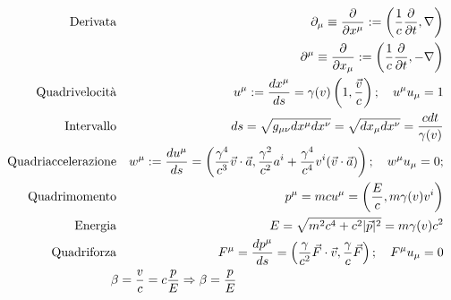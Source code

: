 \begin{align}
    \text{Derivata} & & \partial_\mu \equiv \frac{\partial}{\partial x^\mu} := \left (\frac{1}{c}\frac{\partial}{\partial t}, \nabla \right )\\
    & & \partial^\mu \equiv \frac{\partial}{\partial x_\mu} := \left ( \frac{1}{c}\frac{\partial}{\partial t}, -\nabla \right )\\
    \text{Quadrivelocità} & & u^\mu := \frac{dx^\mu}{ds} = \gamma(v)\left (1, \frac{\vec{v}}{c}\right ); \quad u^\mu u_\mu = 1\\
    \text{Intervallo} & & ds = \sqrt{g_{\mu\nu}dx^\mu dx^\nu} = \sqrt{dx_\mu dx^\nu} = \frac{c dt}{\gamma(v)}\\
    \text{Quadriaccelerazione} & & w^\mu := \frac{du^\mu}{ds} = \left ( \frac{\gamma^4}{c^3}\vec{v}\cdot \vec{a}, \frac{\gamma^2}{c^2}a^i + \frac{\gamma^4}{c^4}v^i(\vec{v}\cdot \vec{a}) \right ); \quad w^\mu u_\mu = 0;\\ 
    \text{Quadrimomento} & & p^\mu = mcu^\mu = \left ( \frac{E}{c}, m\gamma(v)v^i \right )\\
    \text{Energia} & & E = \sqrt{m^2c^4 + c^2|\vec{p}|^2} = m\gamma(v) c^2\\
    \text{Quadriforza} & & F^\mu = \frac{dp^\mu}{ds} = \left ( \frac{\gamma}{c^2}\vec{F}\cdot \vec{v}, \frac{\gamma}{c}\vec{F} \right ); \quad F^\mu u_\mu = 0\\
    \beta = \frac{v}{c} = c\frac{p}{E} \Rightarrow \beta = \frac{p}{E} \span \span
\end{align}